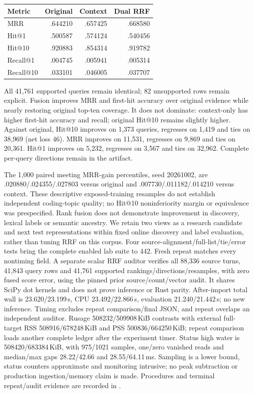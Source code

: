 \documentclass[11pt]{article}
\begin{document}
\begin{center}
\begin{tabular}{lrrr}
Metric & Original & Context & Dual RRF\\\hline
MRR & .644210 & .657425 & .668580\\
Hit@1 & .500587 & .574124 & .540456\\
Hit@10 & .920883 & .854314 & .919782\\
Recall@1 & .004745 & .005941 & .005314\\
Recall@10 & .033101 & .046005 & .037707
\end{tabular}
\end{center}
All 41,761 supported queries remain identical; 82 unsupported rows remain
explicit. Fusion improves MRR and first-hit accuracy over original evidence
while nearly restoring original top-ten coverage. It does not dominate:
context-only has higher first-hit accuracy and recall; original Hit@10 remains
slightly higher. Against original, Hit@10 improves on 1,373 queries, regresses
on 1,419 and ties on 38,969 (net loss 46). MRR improves on 11,531, regresses on
9,869 and ties on 20,361. Hit@1 improves on 5,232, regresses on 3,567 and ties
on 32,962. Complete per-query directions remain in the artifact.

The 1,000 paired meeting MRR-gain percentiles, seed 20261002, are
.020880/.024355/.027803 versus original and .007730/.011182/.014210 versus
context. These descriptive exposed-training resamples do not establish
independent coding-topic quality; no Hit@10 noninferiority margin or equivalence
was prespecified. Rank fusion does not demonstrate improvement in discovery,
lexical labels or semantic ancestry. We retain two views as a research candidate
and next test representations within fixed online discovery and label evaluation,
rather than tuning RRF on this corpus. Four source-alignment/full-list/tie/error
tests bring the complete enabled lab suite to 442. Fresh repeat matches every
nontiming field. A separate scalar RRF auditor verifies all 88,336 source turns,
41,843 query rows and 41,761 supported rankings/directions/resamples, with zero
fused score error, using the pinned prior source/count/vector audit. It shares
SciPy dot kernels and does not prove inference or Rust parity.
After-import total wall is 23.620/23.199\,s, CPU
23.492/22.866\,s, evaluation 21.240/21.442\,s; no new inference. Timing excludes
repeat comparison/final JSON, and repeat overlaps an independent auditor.
Rusage 508232/509908\,KiB contrasts with external full-target RSS
508916/678248\,KiB and PSS 500836/664250\,KiB; repeat comparison loads another
complete ledger after the experiment timer. Status high water is
508420/683384\,KiB, with 975/1021 samples, one/zero vanished reads and median/max
gaps 28.22/42.66 and 28.55/64.11\,ms. Sampling is a lower bound, status counters
approximate and monitoring intrusive; no peak subtraction or production
ingestion/memory claim is made. Procedures and terminal
repeat/audit evidence are recorded in
.
\end{document}
